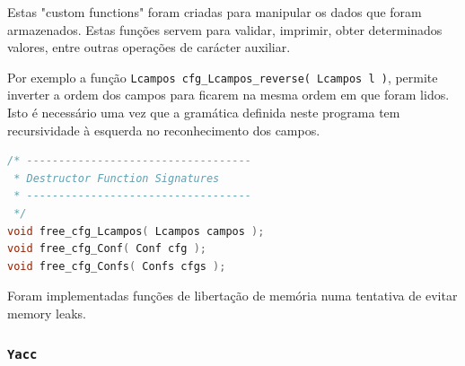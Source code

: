 \documentclass[11pt, a4paper, oneside]{article}
\begin{document}
Estas "custom functions" foram criadas para manipular os dados que foram armazenados. Estas funções servem para validar, imprimir, obter determinados valores, entre outras operações de carácter auxiliar.

Por exemplo a função \texttt{Lcampos cfg\_Lcampos\_reverse( Lcampos l )}, permite inverter a ordem dos campos para ficarem na mesma ordem em que foram lidos. Isto é necessário uma vez que a gramática definida neste programa tem recursividade à esquerda no reconhecimento dos campos.

\newpage
\begin{lstlisting}[language=C, caption={Funções de libertação de memória.}]
/* -----------------------------------
 * Destructor Function Signatures
 * -----------------------------------
 */
void free_cfg_Lcampos( Lcampos campos );
void free_cfg_Conf( Conf cfg );
void free_cfg_Confs( Confs cfgs );
\end{lstlisting} 

Foram implementadas funções de libertação de memória numa tentativa de evitar memory leaks.

\newpage
\subsubsection[Bison]{\texttt{Yacc}}
\end{document}
